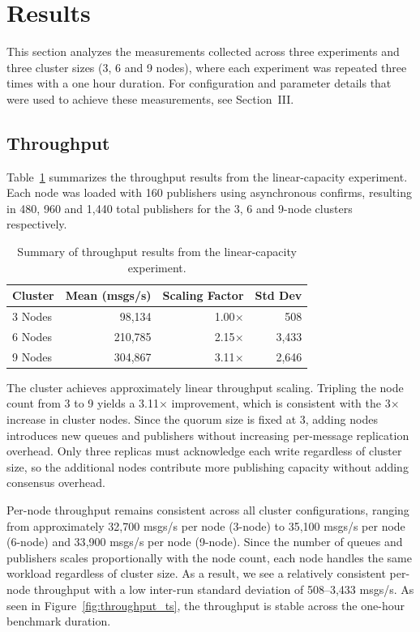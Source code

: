 \section{Results}
This section analyzes the measurements collected across three experiments and three cluster sizes (3, 6 and 9 nodes), where each experiment was repeated three times with a one hour duration. For configuration and parameter details that were used to achieve these measurements, see Section~III.

\subsection{Throughput}
Table~\ref{tab:throughput} summarizes the throughput results from the linear-capacity experiment. Each node was loaded with 160 publishers using asynchronous confirms, resulting in 480, 960 and 1{,}440 total publishers for the 3, 6 and 9-node clusters respectively.

\begin{table}[h]
\centering
\caption{Summary of throughput results from the linear-capacity experiment.}
\label{tab:throughput}
\begin{tabular}{l r r r}
\hline
\textbf{Cluster} & \textbf{Mean (msgs/s)} & \textbf{Scaling Factor} & \textbf{Std Dev} \\
\hline
3 Nodes  & 98{,}134  & 1.00$\times$ & 508  \\
6 Nodes  & 210{,}785 & 2.15$\times$ & 3{,}433 \\
9 Nodes  & 304{,}867 & 3.11$\times$ & 2{,}646 \\
\hline
\end{tabular}
\end{table}

The cluster achieves approximately linear throughput scaling. Tripling the node count from 3 to 9 yields a 3.11$\times$ improvement, which is consistent with the 3$\times$ increase in cluster nodes. Since the quorum size is fixed at 3, adding nodes introduces new queues and publishers without increasing per-message replication overhead. Only three replicas must acknowledge each write regardless of cluster size, so the additional nodes contribute more publishing capacity without adding consensus overhead.

Per-node throughput remains consistent across all cluster configurations, ranging from approximately 32{,}700 msgs/s per node (3-node) to 35{,}100 msgs/s per node (6-node) and 33{,}900 msgs/s per node (9-node). Since the number of queues and publishers scales proportionally with the node count, each node handles the same workload regardless of cluster size. As a result, we see a relatively consistent per-node throughput with a low inter-run standard deviation of 508--3{,}433 msgs/s. As seen in Figure~\ref{fig:throughput_ts}, the throughput is stable across the one-hour benchmark duration.

